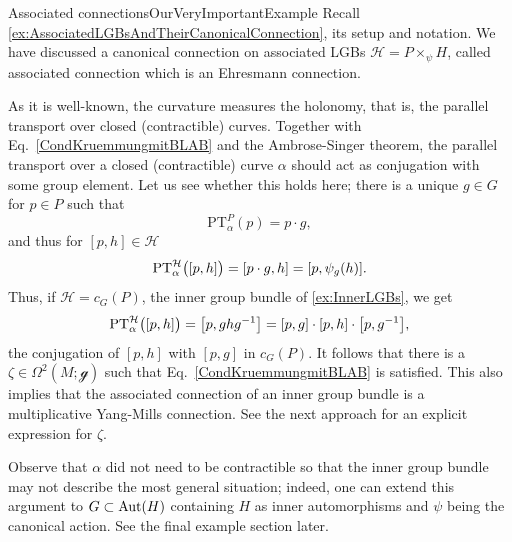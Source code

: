 \documentclass[reqno,a4paper,oneside]{amsart}
\theoremstyle{plain}
\theoremstyle{remark}
\theoremstyle{definition}
\begin{document}
\begin{examples}{Associated connections}{OurVeryImportantExample}
Recall \ref{ex:AssociatedLGBsAndTheirCanonicalConnection}, its setup and notation. We have discussed a canonical connection on associated LGBs $\mathcal{H} = P \times_\psi H$, called associated connection which is an Ehresmann connection. 

As it is well-known, the curvature measures the holonomy, that is, the parallel transport over closed (contractible) curves. Together with Eq.\ \eqref{CondKruemmungmitBLAB} and the Ambrose-Singer theorem, the parallel transport over a closed (contractible) curve $\alpha$ should act as conjugation with some group element. Let us see whether this holds here; there is a unique $g \in G$ for $p \in P$ such that
\begin{equation*}
\mathrm{PT}^{P}_\alpha(p)
=
p \cdot g,
\end{equation*}
and thus for $[p, h] \in \mathcal{H}$
\begin{equation*}
\mathrm{PT}_\alpha^\mathcal{H}\bigl( [p, h] \bigr)
=
\mleft[ p \cdot g, h \mright]
=
\mleft[ p, \psi_g(h) \mright].
\end{equation*}
Thus, if $\mathcal{H} = c_G(P)$, the inner group bundle of \ref{ex:InnerLGBs}, we get
\begin{equation*}
\mathrm{PT}_\alpha^\mathcal{H}\bigl( [p, h] \bigr)
=
\mleft[ p, ghg^{-1} \mright]
=
\mleft[p, g\mright] \cdot
\mleft[p, h\mright] \cdot
\mleft[p, g^{-1}\mright],
\end{equation*}
the conjugation of $[p, h]$ with $[p, g]$ in $c_G(P)$. It follows that there is a $\zeta \in \Omega^2(M; \mathcal{g})$ such that Eq.\ \eqref{CondKruemmungmitBLAB} is satisfied. This also implies that the associated connection of an inner group bundle is a multiplicative Yang-Mills connection. See the next approach for an explicit expression for $\zeta$.

Observe that $\alpha$ did not need to be contractible so that the inner group bundle may not describe the most general situation; indeed, one can extend this argument to $G \subset {\rm Aut}(H)$ containing $H$ as inner automorphisms and $\psi$ being the canonical action. See the final example section later.
\end{examples}
\end{document}
